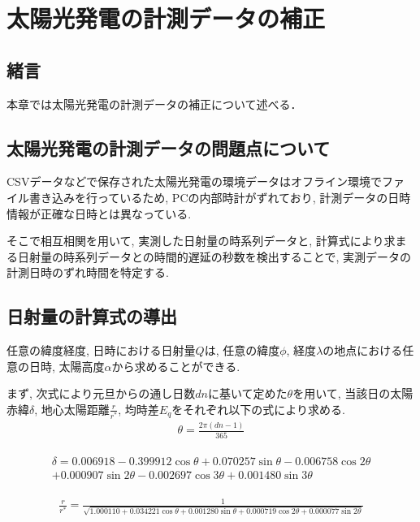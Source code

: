 
\chapter{太陽光発電の計測データの補正}
\label{chap:second}

\section{緒言}
本章では太陽光発電の計測データの補正について述べる．


\section{太陽光発電の計測データの問題点について}
CSVデータなどで保存された太陽光発電の環境データはオフライン環境でファイル書き込みを行っているため, PCの内部時計がずれており, 計測データの日時情報が正確な日時とは異なっている.

そこで相互相関を用いて, 実測した日射量の時系列データと, 計算式により求まる日射量の時系列データとの時間的遅延の秒数を検出することで, 実測データの計測日時のずれ時間を特定する.

\section{日射量の計算式の導出}
任意の緯度経度, 日時における日射量$Q$は, 任意の緯度$\phi$, 経度$\lambda$の地点における任意の日時, 太陽高度$\alpha$から求めることができる.

まず, 次式により元旦からの通し日数$dn$に基いて定めた$\theta$を用いて, 当該日の太陽赤緯$\delta$, 地心太陽距離$\frac{r}{r^{*}}$, 均時差$E_q$をそれぞれ以下の式により求める.
\begin{eqnarray}
  \theta =  \frac{2\pi (dn-1)}{365}
\end{eqnarray}

\begin{eqnarray}
\begin{split}
  \delta =  0.006918-0.399912\cos \theta+0.070257\sin \theta-0.006758\cos 2\theta\\
  +0.000907\sin 2\theta-0.002697\cos 3\theta+0.001480\sin 3\theta
\end{split}
\end{eqnarray}

\begin{eqnarray}
  \frac{r}{r^{*}} =  \frac{1}{\sqrt{1.000110+0.034221\cos \theta+0.001280\sin \theta+0.000719\cos 2\theta+0.000077\sin 2\theta}}
\end{eqnarray}

